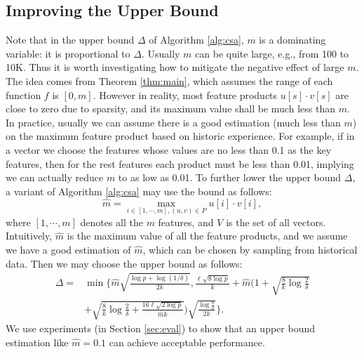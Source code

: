 \documentclass[sigconf,anonymous]{acmart}
\begin{document}
\subsection{Improving the Upper Bound}
\label{sec:imprb}
Note that in the upper bound $\Delta$ of Algorithm \ref{alg:csa}, $m$ is a dominating variable: it is proportional to $\Delta$. Usually $m$ can be quite large, e.g., from 100 to 10K. Thus it is worth investigating how to mitigate the negative effect of large $m$. The idea comes from Theorem \ref{thm:main}, which assumes the range of each function $f$ is $[0,m]$. However in reality, most feature products $u[s]\cdot v[s]$ are close to zero due to sparsity, and its maximum value shall be much less than $m$. In practice, usually we can assume there is a good estimation (much less than $m$) on the maximum feature product based on historic experience. For example, if in a vector we choose the features whose values are no less than 0.1 as the key features, then for the rest features each product must be less than 0.01, implying we can actually reduce $m$ to as low as 0.01. To further lower the upper bound $\Delta$, a variant of Algorithm \ref{alg:csa} may use the bound as follows:
$$\hat{m} = \max_{i\in [1,\cdots,m], (u,v) \in P}u[i]\cdot v[i],$$
where $[1,\cdots,m]$ denotes all the $m$ features, and $V$ is the set of all vectors. Intuitively, $\hat{m}$ is the maximum value of all the feature products, and we assume we have a good estimation of $\hat{m}$, which can be chosen by sampling from historical data. 
Then we may choose the upper bound as follows:
$$\begin{aligned}
\Delta = &\min\bigg\{\hat{m}\sqrt{\frac{\log p + \log(1/\delta)}{2k}}, \frac{\ell\sqrt{8\log p}}{k} +\hat{m}\bigg(1+\sqrt{\frac{8}{k}\log \frac{2}{\delta}}\\ &+ \sqrt{\frac{8}{k}\log \frac{2}{\delta} + \frac{16\ell\sqrt{2\log p}}{\hat{m}k}}\bigg)\sqrt{\frac{\log \frac{8}{\delta}}{2k}}\bigg\}.
\end{aligned}$$
We use experiments (in Section \ref{sec:eval}) to show that an upper bound estimation like $\hat{m} = 0.1$ can achieve acceptable performance.
\end{document}
